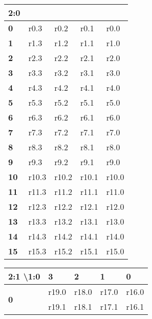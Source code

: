 \begin{table}[h!]
\centering
\begin{tabular}{|l|l l l l|}
\hline
\multicolumn{1}{|l|}{2:0} & \textbf{ } & \textbf{ } & \textbf{ } & \textbf{ } \\ \hline
\textbf{0 }   & r0.3       & r0.2       & r0.1       & r0.0       \\ \hline
\textbf{1 }   & r1.3       & r1.2       & r1.1       & r1.0       \\ \hline
\textbf{2 }   & r2.3       & r2.2       & r2.1       & r2.0       \\ \hline
\textbf{3 }   & r3.3       & r3.2       & r3.1       & r3.0       \\ \hline
\textbf{4 }   & r4.3       & r4.2       & r4.1       & r4.0       \\ \hline
\textbf{5 }   & r5.3       & r5.2       & r5.1       & r5.0       \\ \hline
\textbf{6 }   & r6.3       & r6.2       & r6.1       & r6.0       \\ \hline
\textbf{7 }   & r7.3       & r7.2       & r7.1       & r7.0       \\ \hline
\textbf{8 }   & r8.3       & r8.2       & r8.1       & r8.0       \\ \hline
\textbf{9 }   & r9.3       & r9.2       & r9.1       & r9.0       \\ \hline
\textbf{10}   & r10.3      & r10.2      & r10.1      & r10.0      \\ \hline
\textbf{11}   & r11.3      & r11.2      & r11.1      & r11.0      \\ \hline
\textbf{12}   & r12.3      & r12.2      & r12.1      & r12.0      \\ \hline
\textbf{13}   & r13.3      & r13.2      & r13.1      & r13.0      \\ \hline
\textbf{14}   & r14.3      & r14.2      & r14.1      & r14.0      \\ \hline
\textbf{15}   & r15.3      & r15.2      & r15.1      & r15.0      \\ \hline
\end{tabular}
\quad
\begin{tabular}{|l|l|l|l|l|}
\hline
\multicolumn{1}{|l|}{2:1 \textbackslash 1:0} & \textbf{3} & \textbf{2} & \textbf{1} & \textbf{0} \\ \hline
\multirow{4}{*}{\textbf{0}} & r19.0   & r18.0   & r17.0   & r16.0   \\
                            & r19.1   & r18.1   & r17.1   & r16.1   \\

\end{tabular}
\end{table}
